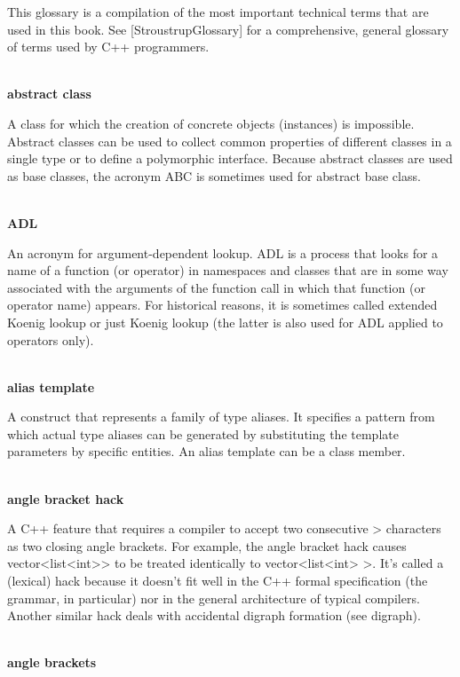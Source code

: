 
This glossary is a compilation of the most important technical terms that are used in this book. See [StroustrupGlossary] for a comprehensive, general glossary of terms used by C++ programmers.

\hspace*{\fill} \\ %
\noindent
\textbf{abstract class}

A class for which the creation of concrete objects (instances) is impossible. Abstract classes can be used to collect common properties of different classes in a single type or to define a polymorphic interface. Because abstract classes are used as base classes, the acronym ABC is sometimes used for abstract base class.

\hspace*{\fill} \\ %
\noindent
\textbf{ADL}

An acronym for argument-dependent lookup. ADL is a process that looks for a name of a function (or operator) in namespaces and classes that are in some way associated with the arguments of the function call in which that function (or operator name) appears. For historical reasons, it is sometimes called extended Koenig lookup or just Koenig lookup (the latter is also used for ADL applied to operators only).

\hspace*{\fill} \\ %
\noindent
\textbf{alias template}  

A construct that represents a family of type aliases. It specifies a pattern from which actual type aliases can be generated by substituting the template parameters by specific entities. An alias template can be a class member.

\hspace*{\fill} \\ %
\noindent
\textbf{angle bracket hack}

A C++ feature that requires a compiler to accept two consecutive > characters as two closing angle brackets. For example, the angle bracket hack causes vector<list<int>> to be treated identically to vector<list<int> >. It’s called a (lexical) hack because it doesn’t fit well in the C++ formal specification (the grammar, in particular) nor in the general architecture of typical compilers. Another similar hack deals with accidental digraph formation (see digraph).

\hspace*{\fill} \\ %
\noindent
\textbf{angle brackets}

